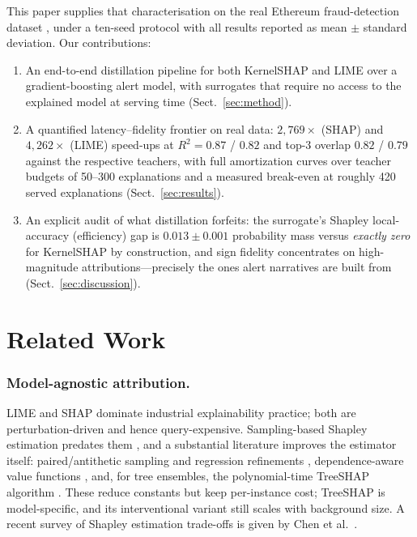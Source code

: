 \documentclass[runningheads]{llncs}
\begin{document}
This paper supplies that characterisation on the real Ethereum
fraud-detection dataset \cite{farrugia2020}, under a ten-seed protocol with
all results reported as mean $\pm$ standard deviation. Our contributions:
\begin{enumerate}
  \item An end-to-end distillation pipeline for both KernelSHAP and LIME
  over a gradient-boosting \cite{friedman2001} alert model, with surrogates
  that require no access to the explained model at serving time
  (Sect.~\ref{sec:method}).
  \item A quantified latency--fidelity frontier on real data:
  $2{,}769\times$ (SHAP) and $4{,}262\times$ (LIME) speed-ups at
  $R^2 = 0.87$ / $0.82$ and top-3 overlap $0.82$ / $0.79$ against the
  respective teachers, with full amortization curves over teacher budgets
  of 50--300 explanations and a measured break-even at roughly 420 served
  explanations (Sect.~\ref{sec:results}).
  \item An explicit audit of what distillation forfeits: the surrogate's
  Shapley local-accuracy (efficiency) gap is $0.013 \pm 0.001$ probability
  mass versus \emph{exactly zero} for KernelSHAP by construction, and sign
  fidelity concentrates on high-magnitude attributions---precisely the
  ones alert narratives are built from (Sect.~\ref{sec:discussion}).
\end{enumerate}

\section{Related Work}
\label{sec:related}

\subsubsection{Model-agnostic attribution.}
LIME \cite{ribeiro2016} and SHAP \cite{lundberg2017} dominate industrial
explainability practice; both are perturbation-driven and hence
query-expensive. Sampling-based Shapley estimation predates them
\cite{strumbelj2014}, and a substantial literature improves the estimator
itself: paired/antithetic sampling and regression refinements
\cite{covert2021_kshap}, dependence-aware value functions \cite{aas2021},
and, for tree ensembles, the polynomial-time TreeSHAP algorithm
\cite{lundberg2020}. These reduce constants but keep per-instance cost;
TreeSHAP is model-specific, and its interventional variant still scales
with background size. A recent survey of Shapley estimation trade-offs is
given by Chen et al.\ \cite{chen2023}.
\end{document}

